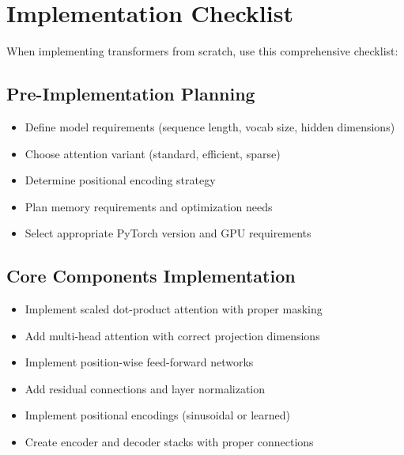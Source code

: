 \documentclass[11pt]{article}
\begin{document}
\section{Implementation Checklist}

When implementing transformers from scratch, use this comprehensive checklist:

\subsection{Pre-Implementation Planning}
\begin{itemize}
    \item[$\square$] Define model requirements (sequence length, vocab size, hidden dimensions)
    \item[$\square$] Choose attention variant (standard, efficient, sparse)
    \item[$\square$] Determine positional encoding strategy
    \item[$\square$] Plan memory requirements and optimization needs
    \item[$\square$] Select appropriate PyTorch version and GPU requirements
\end{itemize}

\subsection{Core Components Implementation}
\begin{itemize}
    \item[$\square$] Implement scaled dot-product attention with proper masking
    \item[$\square$] Add multi-head attention with correct projection dimensions
    \item[$\square$] Implement position-wise feed-forward networks
    \item[$\square$] Add residual connections and layer normalization
    \item[$\square$] Implement positional encodings (sinusoidal or learned)
    \item[$\square$] Create encoder and decoder stacks with proper connections
\end{itemize}
\end{document}
